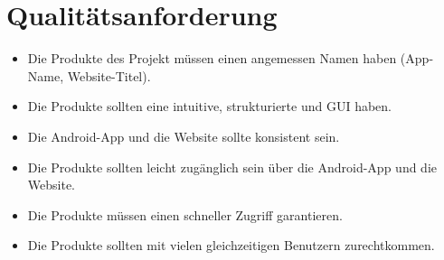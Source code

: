 \section{Qualitätsanforderung}
\begin{itemize}
\item
Die Produkte des Projekt müssen einen angemessen Namen haben (App-Name, Website-Titel).
\item
Die Produkte sollten eine intuitive, strukturierte und  GUI haben.
\item
Die Android-App und die Website sollte konsistent sein.
\item
Die Produkte sollten leicht zugänglich sein über die Android-App und die Website.
\item
Die Produkte müssen einen schneller Zugriff garantieren.
\item
Die Produkte sollten mit vielen gleichzeitigen Benutzern zurechtkommen.
\end{itemize}
